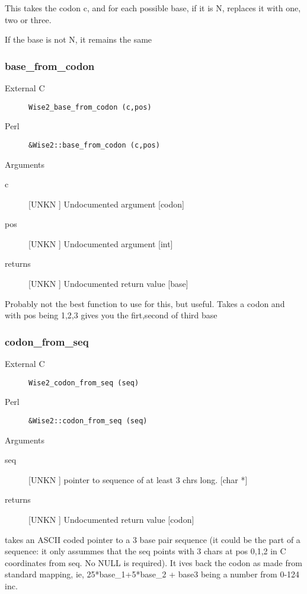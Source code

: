 This takes the codon c, and for each possible base, 
if it is N, replaces it with one, two or three.


If the base is not N, it remains the same


\subsubsection{base_from_codon}
\begin{description}
\item[External C] {\tt Wise2_base_from_codon (c,pos)}
\item[Perl] {\tt &Wise2::base_from_codon (c,pos)}

\end{description}
Arguments
\begin{description}
\item[c] [UNKN ] Undocumented argument [codon]
\item[pos] [UNKN ] Undocumented argument [int]
\item[returns] [UNKN ] Undocumented return value [base]
\end{description}
Probably not the best function to use for this, but 
useful. Takes a codon and with pos being 1,2,3 gives
you the firt,second of third base


\subsubsection{codon_from_seq}
\begin{description}
\item[External C] {\tt Wise2_codon_from_seq (seq)}
\item[Perl] {\tt &Wise2::codon_from_seq (seq)}

\end{description}
Arguments
\begin{description}
\item[seq] [UNKN ] pointer to sequence of at least 3 chrs long. [char *]
\item[returns] [UNKN ] Undocumented return value [codon]
\end{description}
takes an ASCII coded pointer to a 3 base pair
sequence (it could be the part of a sequence: it only
assummes that the seq points with 3 chars at pos 0,1,2 
in C coordinates from seq. No NULL is required). It 
ives back the codon as made from standard mapping, ie,
25*base_1+5*base_2 + base3 being a number from 0-124 inc.


